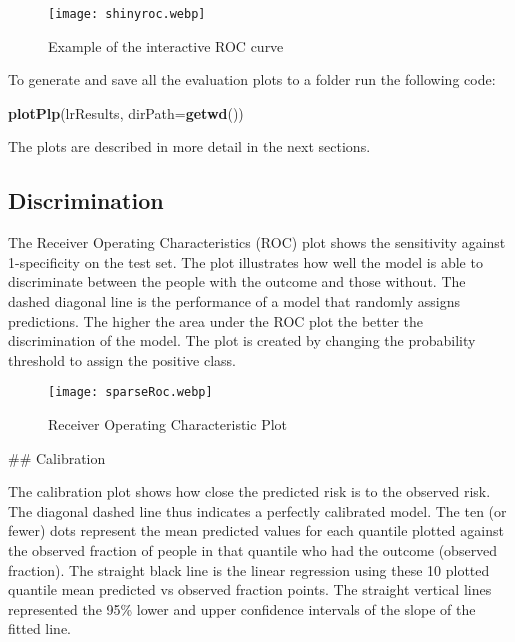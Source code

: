 \documentclass[
]{article}
\newenvironment{Shaded}{\begin{snugshade}}{\end{snugshade}}
\newcommand{\AttributeTok}[1]{\textcolor[rgb]{0.13,0.29,0.53}{#1}}
\newcommand{\FunctionTok}[1]{\textcolor[rgb]{0.13,0.29,0.53}{\textbf{#1}}}
\newcommand{\NormalTok}[1]{#1}
\begin{document}
\begin{figure}
\centering
\texttt{[image: shinyroc.webp]}
\caption{Example of the interactive ROC curve}
\end{figure}

To generate and save all the evaluation plots to a folder run the
following code:

\begin{Shaded}
\begin{Highlighting}[]
\FunctionTok{plotPlp}\NormalTok{(lrResults, }\AttributeTok{dirPath=}\FunctionTok{getwd}\NormalTok{())}
\end{Highlighting}
\end{Shaded}

The plots are described in more detail in the next sections.

\newpage

\hypertarget{discrimination}{%
\subsection{Discrimination}\label{discrimination}}

The Receiver Operating Characteristics (ROC) plot shows the sensitivity
against 1-specificity on the test set. The plot illustrates how well the
model is able to discriminate between the people with the outcome and
those without. The dashed diagonal line is the performance of a model
that randomly assigns predictions. The higher the area under the ROC
plot the better the discrimination of the model. The plot is created by
changing the probability threshold to assign the positive class.

\begin{figure}
\centering
\texttt{[image: sparseRoc.webp]}
\caption{Receiver Operating Characteristic Plot}
\end{figure}

\newpage

\#\# Calibration

The calibration plot shows how close the predicted risk is to the
observed risk. The diagonal dashed line thus indicates a perfectly
calibrated model. The ten (or fewer) dots represent the mean predicted
values for each quantile plotted against the observed fraction of people
in that quantile who had the outcome (observed fraction). The straight
black line is the linear regression using these 10 plotted quantile mean
predicted vs observed fraction points. The straight vertical lines
represented the 95\% lower and upper confidence intervals of the slope
of the fitted line.
\end{document}

